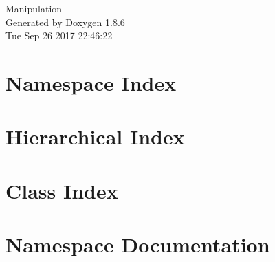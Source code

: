 \documentclass[twoside]{book}
\newcommand{\clearemptydoublepage}{%
  \newpage{\pagestyle{empty}\cleardoublepage}%
}
\begin{document}
\hypersetup{pageanchor=false}
\begin{titlepage}
\vspace*{7cm}
\begin{center}%
{\Large Manipulation }\\
\vspace*{1cm}
{\large Generated by Doxygen 1.8.6}\\
\vspace*{0.5cm}
{\small Tue Sep 26 2017 22:46:22}\\
\end{center}
\end{titlepage}
\clearemptydoublepage
\tableofcontents
\clearemptydoublepage
{}
\hypersetup{pageanchor=true}

\chapter{Namespace Index}

\chapter{Hierarchical Index}

\chapter{Class Index}

\chapter{Namespace Documentation}

\end{document}
